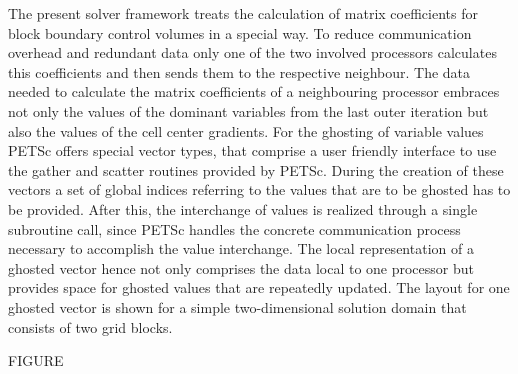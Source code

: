 The present solver framework treats the calculation of matrix coefficients for block boundary control volumes in a special way. To reduce communication overhead and redundant data only one of the two involved processors calculates this coefficients and then sends them to the respective neighbour. The data needed to calculate the matrix coefficients of a neighbouring processor embraces not only the values of the dominant variables from the last outer iteration but also the values of the cell center gradients. For the ghosting of variable values PETSc offers special vector types, that comprise a user friendly interface to use the gather and scatter routines provided by PETSc. During the creation of these vectors a set of global indices referring to the values that are to be ghosted has to be provided. After this, the interchange of values is realized through a single subroutine call, since PETSc handles the concrete communication process necessary to accomplish the value interchange. The local representation of a ghosted vector hence not only comprises the data local to one processor but provides space for ghosted values that are repeatedly updated. The layout for one ghosted vector is shown for a simple two-dimensional solution domain that consists of two grid blocks.

FIGURE


